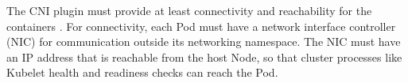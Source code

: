 \documentclass[english, 12pt, a4paper, sci, utf8, a-2b, online]{aaltothesis}
\begin{document}





The CNI plugin must provide at least connectivity and reachability for the containers \cite{cni-tkng}.
For connectivity, each Pod must have a network interface controller (NIC) for communication outside its networking namespace.
The NIC must have an IP address that is reachable from the host Node, so that cluster processes like Kubelet health and readiness checks can reach the Pod.
\end{document}
